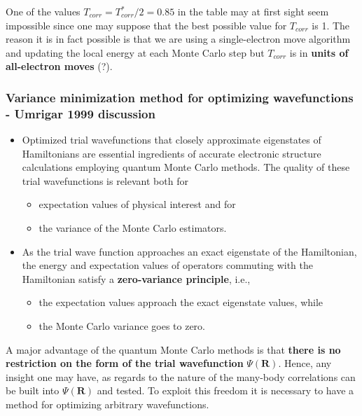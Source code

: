 \documentclass[twoside,english]{uiofysmaster}
\begin{document}
One of the values $T_{corr} = T_{corr}^\ast /2 = 0.85$ in the table may at first sight seem impossible since one may suppose that the best possible value for $T_{corr}$ is 1. The reason it is in fact possible is that we are using a single-electron move algorithm and updating the local energy at each Monte Carlo step but $T_{corr}$ is in \textbf{units of all-electron moves} (?).
\cite{Umrigar1999}

\subsubsection{Variance minimization method for optimizing wavefunctions - Umrigar 1999 discussion}
\begin{itemize}
	\item Optimized trial wavefunctions that closely approximate eigenstates of Hamiltonians are essential ingredients of accurate electronic structure calculations employing quantum Monte Carlo methods. The quality of these trial wavefunctions is relevant both for
	\begin{itemize}
		\item expectation values of physical interest and for 
		\item the variance of the Monte Carlo estimators. 
	\end{itemize}
	\item As the trial wave function approaches an exact eigenstate of the Hamiltonian, the energy and expectation values of operators commuting with the Hamiltonian satisfy a \textbf{zero-variance principle}, i.e., 
	\begin{itemize}
		\item the expectation values approach the exact eigenstate values, while 
		\item the Monte Carlo variance goes to zero.
	\end{itemize}
\end{itemize}

A major advantage of the quantum Monte Carlo methods is that \textbf{there is no restriction on the form of the trial wavefunction} $\Psi (\bm{R})$. Hence, any insight one may have, as regards to the nature of the many-body correlations can be built into $\Psi(\bm{R})$ and tested. To exploit this freedom it is necessary to have a method for optimizing arbitrary wavefunctions.
\end{document}
